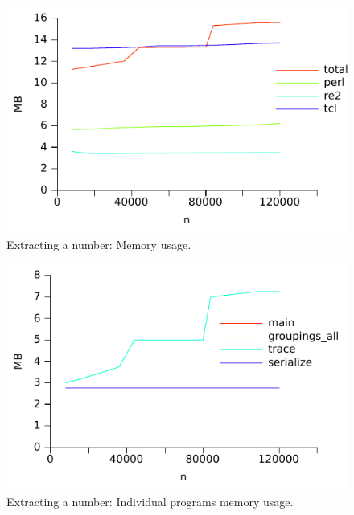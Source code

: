 \begin{figure}
\centering
\includegraphics{benchmarks/memory/number_all.pdf}
\caption{Extracting a number: Memory usage.}
\label{fig:number_mem}
\end{figure}


\begin{figure}
\centering
\includegraphics{benchmarks/memory/number_individual.pdf}
\caption{Extracting a number: Individual programs memory usage.}
\label{fig:number_mem_individual}
\end{figure}

